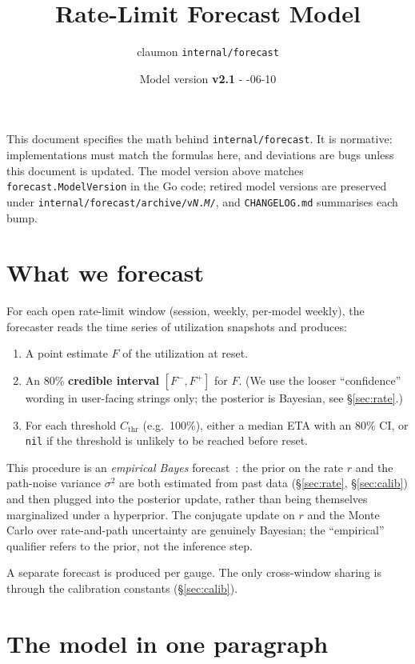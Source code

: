 \documentclass[11pt]{article}
\title{Rate-Limit Forecast Model}
\author{claumon \texttt{internal/forecast}}
\date{Model version \textbf{v2.1} \enspace - \enspace 2026-06-10}
\newcommand{\Cthr}{C_{\text{thr}}}
\begin{document}
\maketitle

This document specifies the math behind \texttt{internal/forecast}. It is
normative: implementations must match the formulas here, and deviations are
bugs unless this document is updated. The model version above matches
\texttt{forecast.ModelVersion} in the Go code; retired model versions are
preserved under \texttt{internal/forecast/archive/v\textit{N}.\textit{M}/},
and \texttt{CHANGELOG.md} summarises each bump.

\section{What we forecast}

For each open rate-limit window (session, weekly, per-model weekly), the
forecaster reads the time series of utilization snapshots and produces:

\begin{enumerate}
  \item A point estimate $F$ of the utilization at reset.
  \item An 80\% \textbf{credible interval} $[F^-, F^+]$ for $F$. (We use the
    looser ``confidence'' wording in user-facing strings only; the posterior
    is Bayesian, see \S\ref{sec:rate}.)
  \item For each threshold $\Cthr$ (e.g.\ 100\%), either a median ETA with an
    80\% CI, or \texttt{nil} if the threshold is unlikely to be reached
    before reset.
\end{enumerate}

This procedure is an \emph{empirical Bayes} forecast~\cite{casella1985}: the prior on the rate
$r$ and the path-noise variance $\sigma^2$ are both estimated from past data
(\S\ref{sec:rate}, \S\ref{sec:calib}) and then plugged into the posterior
update, rather than being themselves marginalized under a hyperprior. The
conjugate update on $r$ and the Monte Carlo over rate-and-path uncertainty
are genuinely Bayesian; the ``empirical'' qualifier refers to the prior, not
the inference step.

A separate forecast is produced per gauge. The only cross-window sharing is
through the calibration constants (\S\ref{sec:calib}).

\section{The model in one paragraph}
\end{document}
